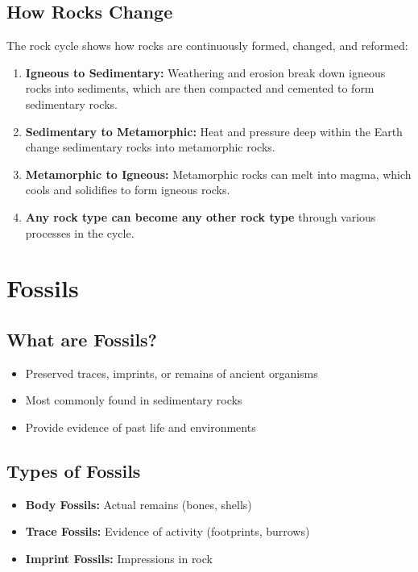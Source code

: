 \documentclass{article}
\begin{document}
\subsection{How Rocks Change}
The rock cycle shows how rocks are continuously formed, changed, and reformed:
\begin{enumerate}
    \item \textbf{Igneous to Sedimentary:} Weathering and erosion break down igneous rocks into sediments, which are then compacted and cemented to form sedimentary rocks.
    \item \textbf{Sedimentary to Metamorphic:} Heat and pressure deep within the Earth change sedimentary rocks into metamorphic rocks.
    \item \textbf{Metamorphic to Igneous:} Metamorphic rocks can melt into magma, which cools and solidifies to form igneous rocks.
    \item \textbf{Any rock type can become any other rock type} through various processes in the cycle.
\end{enumerate}

\section{Fossils}

\subsection{What are Fossils?}
\begin{itemize}
    \item Preserved traces, imprints, or remains of ancient organisms
    \item Most commonly found in sedimentary rocks
    \item Provide evidence of past life and environments
\end{itemize}

\subsection{Types of Fossils}
\begin{itemize}
    \item \textbf{Body Fossils:} Actual remains (bones, shells)
    \item \textbf{Trace Fossils:} Evidence of activity (footprints, burrows)
    \item \textbf{Imprint Fossils:} Impressions in rock
\end{itemize}
\end{document}
